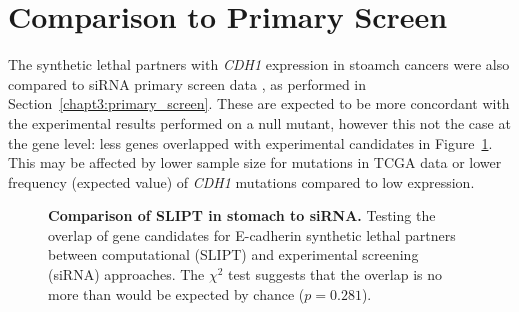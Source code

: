 
\FloatBarrier

\section{Comparison to Primary Screen} \label{appendix:compare_exprSL_genes_stad}

The synthetic lethal partners with \textit{CDH1} expression in stoamch cancers were also compared to siRNA primary screen data \citep{Telford2015}, as performed in Section~\ref{chapt3:primary_screen}. These are expected to be more concordant with the experimental results performed on a null mutant, however this not the case at the gene level: less genes overlapped with experimental candidates in Figure~\ref{fig:Venn_allgenes_stad}. This may be affected by lower sample size for mutations in TCGA data or lower frequency (expected value) of \textit{CDH1} mutations compared to low expression. 



\begin{figure}[!ht]
  \centering
    \caption[Comparison of SLIPT in stomach to siRNA]{\small \textbf{Comparison of SLIPT in stomach to siRNA.} Testing the overlap of gene candidates for E-cadherin synthetic lethal partners between computational (SLIPT) and experimental screening (siRNA) approaches. The $\chi^2$ test suggests that the overlap is no more than would be expected by chance ($p = 0.281$). %
}
\label{fig:Venn_allgenes_stad}
\end{figure}


\FloatBarrier


